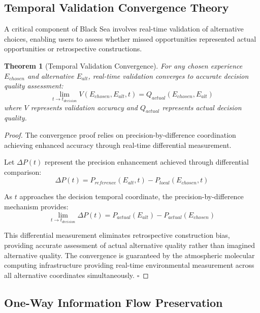 \documentclass[12pt,a4paper]{article}
\newtheorem{theorem}{Theorem}
\begin{document}
\subsection{Temporal Validation Convergence Theory}

A critical component of Black Sea involves real-time validation of alternative choices, enabling users to assess whether missed opportunities represented actual opportunities or retrospective constructions.

\begin{theorem}[Temporal Validation Convergence]
For any chosen experience $E_{chosen}$ and alternative $E_{alt}$, real-time validation converges to accurate decision quality assessment:
\begin{equation}
\lim_{t \rightarrow t_{decision}} V(E_{chosen}, E_{alt}, t) = Q_{actual}(E_{chosen}, E_{alt})
\end{equation}
where $V$ represents validation accuracy and $Q_{actual}$ represents actual decision quality.
\end{theorem}

\begin{proof}
The convergence proof relies on precision-by-difference coordination achieving enhanced accuracy through real-time differential measurement.

Let $\Delta P(t)$ represent the precision enhancement achieved through differential comparison:
\begin{equation}
\Delta P(t) = P_{reference}(E_{alt}, t) - P_{local}(E_{chosen}, t)
\end{equation}

As $t$ approaches the decision temporal coordinate, the precision-by-difference mechanism provides:
\begin{equation}
\lim_{t \rightarrow t_{decision}} \Delta P(t) = P_{actual}(E_{alt}) - P_{actual}(E_{chosen})
\end{equation}

This differential measurement eliminates retrospective construction bias, providing accurate assessment of actual alternative quality rather than imagined alternative quality. The convergence is guaranteed by the atmospheric molecular computing infrastructure providing real-time environmental measurement across all alternative coordinates simultaneously. $\square$
\end{proof}

\subsection{One-Way Information Flow Preservation}
\end{document}
